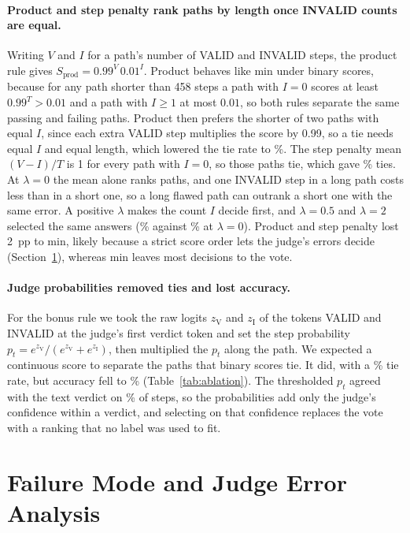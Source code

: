 \documentclass{article}
\begin{document}
\paragraph{Product and step penalty rank paths by length once INVALID counts are equal.} Writing $V$ and $I$ for a path's number of VALID and INVALID steps, the product rule gives $S_{\text{prod}}=0.99^{V}\,0.01^{I}$. Product behaves like min under binary scores, because for any path shorter than 458 steps a path with $I=0$ scores at least $0.99^{T}>0.01$ and a path with $I\ge 1$ at most $0.01$, so both rules separate the same passing and failing paths. Product then prefers the shorter of two paths with equal $I$, since each extra VALID step multiplies the score by 0.99, so a tie needs equal $I$ and equal length, which lowered the tie rate to \tieProduct\%. The step penalty mean $(V-I)/T$ is 1 for every path with $I=0$, so those paths tie, which gave \tiePenTwo\% ties. At $\lambda=0$ the mean alone ranks paths, and one INVALID step in a long path costs less than in a short one, so a long flawed path can outrank a short one with the same error. A positive $\lambda$ makes the count $I$ decide first, and $\lambda=0.5$ and $\lambda=2$ selected the same answers (\accPenTwo\% against \accPenZero\% at $\lambda=0$). Product and step penalty lost 2~pp to min, likely because a strict score order lets the judge's errors decide (Section~\ref{sec:failures}), whereas min leaves most decisions to the vote.

\paragraph{Judge probabilities removed ties and lost accuracy.} For the bonus rule we took the raw logits $z_{\text{V}}$ and $z_{\text{I}}$ of the tokens VALID and INVALID at the judge's first verdict token and set the step probability $p_t=e^{z_{\text{V}}}/(e^{z_{\text{V}}}+e^{z_{\text{I}}})$, then multiplied the $p_t$ along the path. We expected a continuous score to separate the paths that binary scores tie. It did, with a \tieLogprob\% tie rate, but accuracy fell to \accLogprob\% (Table~\ref{tab:ablation}). The thresholded $p_t$ agreed with the text verdict on \agreeLogprob\% of steps, so the probabilities add only the judge's confidence within a verdict, and selecting on that confidence replaces the vote with a ranking that no label was used to fit.

\section{Failure Mode and Judge Error Analysis}
\label{sec:failures}
\end{document}
